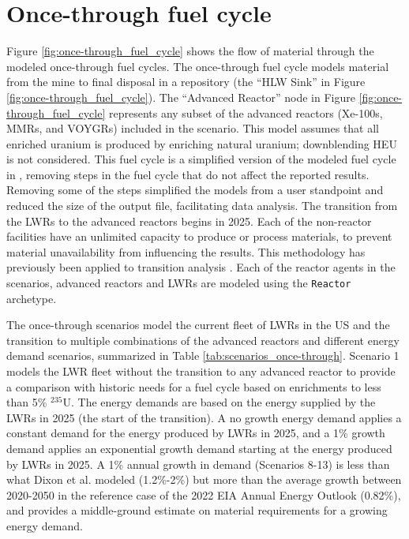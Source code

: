 \section{Once-through fuel cycle} \label{sec:once-through-methods}
Figure \ref{fig:once-through_fuel_cycle} shows the flow of material through 
the modeled once-through fuel cycles. The once-through fuel cycle models 
material from the mine to final disposal in a repository (the 
``HLW Sink'' in Figure \ref{fig:once-through_fuel_cycle}). The 
``Advanced Reactor'' node in Figure 
\ref{fig:once-through_fuel_cycle} represents any subset of the advanced 
reactors (Xe-100s, \glspl{MMR}, and VOYGRs) included 
in the scenario. This model assumes that all enriched uranium is produced 
by enriching natural uranium; downblending \gls{HEU} is not considered. 
This fuel cycle is a simplified version of the modeled fuel cycle in 
\cite{bachmann_enrichment_2021}, removing steps in the fuel cycle that 
do not affect the reported results. Removing some of the steps simplified 
the models from a user standpoint and reduced the size of the \Cyclus 
output file, facilitating data analysis. The transition from the 
\glspl{LWR} to the advanced reactors begins in 2025. Each of the non-reactor 
facilities have an unlimited capacity to produce or process materials,
to prevent material unavailability from influencing the results. 
This methodology has previously been applied to transition analysis 
\cite{djokic_application_2015}. Each of the reactor agents in the scenarios, 
advanced reactors and \glspl{LWR} are modeled using the \Cycamore 
\texttt{Reactor} archetype.



The once-through scenarios model the current fleet of \glspl{LWR} in the 
US and the transition to multiple combinations of the advanced reactors 
and different energy demand scenarios, summarized in Table 
\ref{tab:scenarios_once-through}. Scenario 1 models the \gls{LWR} fleet 
without the transition to any advanced reactor to provide a comparison with 
historic needs for a fuel cycle based on enrichments to less than 5\% $^{235}$U. 
The energy demands are based on the energy supplied by the \glspl{LWR} in 
2025 (the start of the transition). A no growth energy demand applies a 
constant demand for the energy produced by \glspl{LWR} in 2025, and a 1\% 
growth demand applies an exponential growth demand starting at the energy 
produced by \glspl{LWR} in 2025. A 1\% annual growth in demand (Scenarios 8-13) 
is less than what Dixon et al. \cite{dixon_estimated_2022} modeled
(1.2\%-2\%) but more than the average growth between 2020-2050 in the 
reference case of the 2022 \gls{EIA} Annual Energy Outlook 
\cite{us_energy_information_administration_annual_2022} (0.82\%), and 
provides a middle-ground estimate on material requirements for a growing 
energy demand. 

